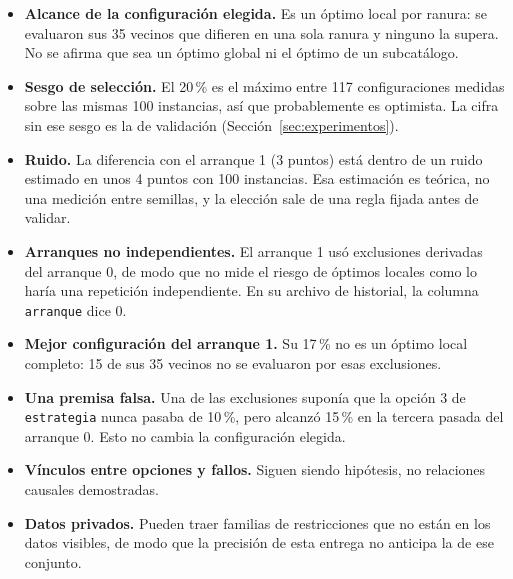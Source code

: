 \begin{itemize}
  \item \textbf{Alcance de la configuración elegida.} Es un óptimo local por ranura: se
    evaluaron sus 35 vecinos que difieren en una sola ranura y ninguno la supera. No se
    afirma que sea un óptimo global ni el óptimo de un subcatálogo.
  \item \textbf{Sesgo de selección.} El 20\,\% es el máximo entre 117 configuraciones medidas
    sobre las mismas 100 instancias, así que probablemente es optimista. La cifra sin ese
    sesgo es la de validación (Sección~\ref{sec:experimentos}).
  \item \textbf{Ruido.} La diferencia con el arranque 1 (3 puntos) está dentro de un ruido
    estimado en unos 4 puntos con 100 instancias. Esa estimación es teórica, no una medición
    entre semillas, y la elección sale de una regla fijada antes de validar.
  \item \textbf{Arranques no independientes.} El arranque 1 usó exclusiones derivadas del
    arranque 0, de modo que no mide el riesgo de óptimos locales como lo haría una repetición
    independiente. En su archivo de historial, la columna \texttt{arranque} dice 0.
  \item \textbf{Mejor configuración del arranque 1.} Su 17\,\% no es un óptimo local completo:
    15 de sus 35 vecinos no se evaluaron por esas exclusiones.
  \item \textbf{Una premisa falsa.} Una de las exclusiones suponía que la opción 3 de
    \texttt{estrategia} nunca pasaba de 10\,\%, pero alcanzó 15\,\% en la tercera pasada del
    arranque 0. Esto no cambia la configuración elegida.
  \item \textbf{Vínculos entre opciones y fallos.} Siguen siendo hipótesis, no relaciones
    causales demostradas.
  \item \textbf{Datos privados.} Pueden traer familias de restricciones que no están en los
    datos visibles, de modo que la precisión de esta entrega no anticipa la de ese conjunto.
\end{itemize}
